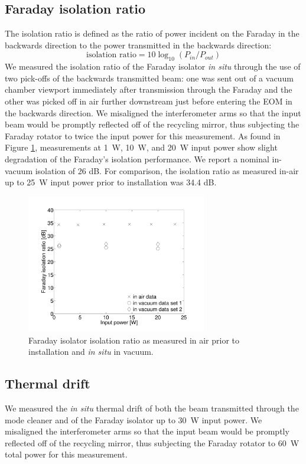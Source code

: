 \subsection{Faraday isolation ratio}
The isolation ratio is defined as the ratio of power incident on the
Faraday in the backwards direction to the power transmitted in the
backwards direction:
\begin{equation}
\mbox{isolation ratio} = 10 \log_{10}(P_{in}/P_{out})
\end{equation}
We measured the isolation ratio of the Faraday isolator \emph{in situ}
through the use of two pick-offs of the backwards transmitted beam:
one was sent out of a vacuum chamber viewport immediately after
transmission through the Faraday and the other was picked off in air
further downstream just before entering the EOM in the backwards
direction. We misaligned the interferometer arms so that the input
beam would be promptly reflected off of the recycling mirror, thus
subjecting the Faraday rotator to twice the input power for this
measurement. As found in Figure \ref{fig:IR}, measurements at 1~W,
10~W, and 20~W input power show slight degradation of the Faraday's
isolation performance. We report a nominal in-vacuum isolation of 26
dB. For comparison, the isolation ratio
as measured in-air up to 25~W input power prior to installation was
34.4 dB.

\begin{figure}
\begin{centering}
\includegraphics[width=0.7\textwidth]{figures/FaradayIR.pdf}
\caption{Faraday isolator isolation ratio as measured in air prior to
  installation and \emph{in situ} in vacuum.} 
\label{fig:IR}
\end{centering}
\end{figure}

\subsection{Thermal drift}
We measured the \emph{in situ} thermal drift of both the beam
transmitted through the mode cleaner and of the Faraday isolator up to
30~W input power. We misaligned the interferometer arms so that the
input beam would be promptly reflected off of the recycling mirror,
thus subjecting the Faraday rotator to 60~W total power for this
measurement.


